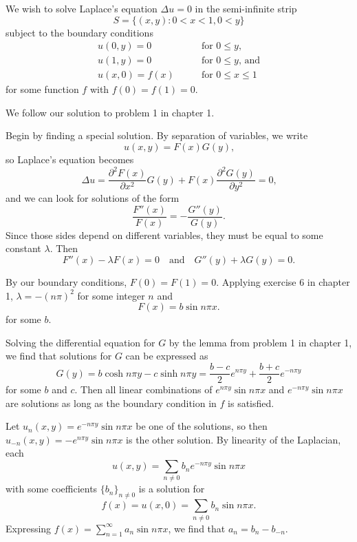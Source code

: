 \documentclass[oneside]{article}
\begin{document}
  We wish to solve Laplace's equation $\Delta u = 0$ in the semi-infinite strip\[
    S = \{(x, y) : 0<x<1, 0<y\}
  \] subject to the boundary conditions\begin{align*}
    u(0, y) = 0 &\qquad\text{for } 0 \leq y \text{,} \\
    u(1, y) = 0 &\qquad\text{for } 0 \leq y \text{, and} \\
    u(x, 0) = f(x) &\qquad\text{for } 0 \leq x \leq 1
  \end{align*} for some function $f$ with $f(0) = f(1) = 0$.

  We follow our solution to problem 1 in chapter 1.

  Begin by finding a special solution. By separation of variables, we write \[
    u(x, y) = F(x)G(y) \text{,}
  \] so Laplace's equation becomes\[
    \Delta u
    = \frac{\partial^2 F(x)}{\partial x^2}G(y)
    + F(x)\frac{\partial^2 G(y)}{\partial y^2} = 0 \text{,}
  \] and we can look for solutions of the form \[
    \frac{F''(x)}{F(x)} = -\frac{G''(y)}{G(y)} \text{.}
  \] Since those sides depend on different variables, they must be equal to some constant $\lambda$. Then\[
    F''(x) - \lambda F(x) = 0\quad\text{and}\quad G''(y) + \lambda G(y) = 0 \text{.}
  \]

  By our boundary conditions, $F(0) = F(1) = 0$. Applying exercise 6 in chapter 1, $\lambda = -(n\pi)^2$ for some integer $n$
  and \[
    F(x) = b \sin n \pi x \text{.}
  \] for some $b$.

  Solving the differential equation for $G$ by the lemma from problem 1 in chapter 1, we find that solutions for $G$ can be expressed as\[
    G(y) = b \cosh n \pi y - c \sinh n \pi y
    = \frac{b - c}{2} e^{n\pi y} + \frac{b+c}{2} e^{-n\pi y}
  \] for some $b$ and $c$. Then all linear combinations of $e^{n \pi y} \sin n \pi x$ and $e^{-n \pi y} \sin n \pi x$ are solutions as long as the boundary condition in $f$ is satisfied.

  Let $u_n(x, y) = e^{-n \pi y} \sin n \pi x$ be one of the solutions, so then $u_{-n}(x, y) = -e^{n \pi y} \sin n \pi x$ is the other solution. By linearity of the Laplacian, each \[
    u(x, y) = \sum_{n \neq 0} b_n e^{-n \pi y} \sin n \pi x
  \] with some coefficients $\{b_n\}_{n\neq0}$ is a solution for \[
    f(x) = u(x, 0) = \sum_{n \neq 0} b_n \sin n \pi x \text{.}
  \] Expressing $f(x) = \sum_{n=1}^\infty a_n \sin n \pi x$, we find that $a_n = b_n - b_{-n}$.
\end{document}
